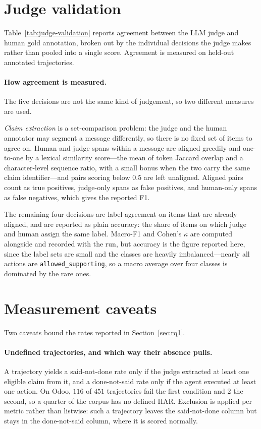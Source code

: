 \documentclass{article} %
\begin{document}
\section{Judge validation}
\label{app:judge-validation}
Table~\ref{tab:judge-validation} reports agreement between the LLM judge and
human gold annotation, broken out by the individual decisions the judge makes
rather than pooled into a single score. Agreement is measured on held-out
annotated trajectories.


\paragraph{How agreement is measured.} The five decisions are not the same kind
of judgement, so two different measures are used.

\emph{Claim extraction} is a set-comparison problem: the judge and the human
annotator may segment a message differently, so there is no fixed set of items
to agree on. Human and judge spans within a message are aligned greedily and
one-to-one by a lexical similarity score---the mean of token Jaccard overlap and
a character-level sequence ratio, with a small bonus when the two carry the same
claim identifier---and pairs scoring below $0.5$ are left unaligned. Aligned
pairs count as true positives, judge-only spans as false positives, and
human-only spans as false negatives, which gives the reported F1.

The remaining four decisions are label agreement on items that are already
aligned, and are reported as plain accuracy: the share of items on which judge
and human assign the same label. Macro-F1 and Cohen's $\kappa$ are computed
alongside and recorded with the run, but accuracy is the figure reported here,
since the label sets are small and the classes are heavily imbalanced---nearly
all actions are \texttt{allowed\_supporting}, so a macro average over four
classes is dominated by the rare ones.


\section{Measurement caveats}
\label{app:caveats}
Two caveats bound the rates reported in Section~\ref{sec:rq1}.

\paragraph{Undefined trajectories, and which way their absence pulls.} A
trajectory yields a said-not-done rate only if the judge extracted at least one
eligible claim from it, and a done-not-said rate only if the agent executed at
least one action. On Odoo, $116$ of $451$ trajectories fail the first condition
and $2$ the second, so a quarter of the corpus has no defined HAR. Exclusion is
applied per metric rather than listwise: such a trajectory leaves the
said-not-done column but stays in the done-not-said column, where it is scored
normally.
\end{document}
